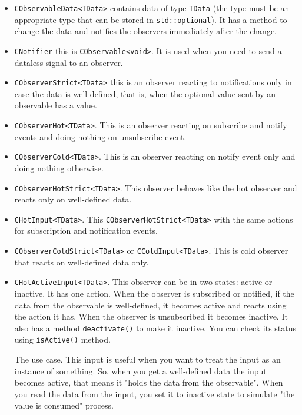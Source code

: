 \documentclass{article}
\begin{document}
\begin{itemize}
\item \verb"CObservableData<TData>" contains data of type \verb"TData" (the type must be an appropriate type that can be stored in \verb"std::optional"). It has a method to change the data and notifies the observers immediately after the change.

\item \verb"CNotifier" this is \verb"CObservable<void>". It is used when you need to send a dataless signal to an observer.

\item \verb"CObserverStrict<TData>" this is an observer reacting to notifications only in case the data is well-defined, that is, when the optional value sent by an observable has a value.

\item \verb"CObserverHot<TData>". This is an observer reacting on subscribe and notify events and doing nothing on unsubscribe event.

\item \verb"CObserverCold<TData>". This is an observer reacting on notify event only and doing nothing otherwise.

\item \verb"CObserverHotStrict<TData>". This observer behaves like the hot observer and reacts only on well-defined data.
\item \verb"CHotInput<TData>". This \verb"CObserverHotStrict<TData>" with the same actions for subscription and notification events.

\item \verb"CObserverColdStrict<TData>" or \verb"CColdInput<TData>". This is cold observer that reacts on well-defined data only.

\item \verb"CHotActiveInput<TData>". This observer can be in two states: active or inactive. It has one action. When the observer is subscribed or notified, if the data from the observable is well-defined, it becomes active and reacts using the action it has. When the observer is unsubscribed it becomes inactive. It also has a method \verb"deactivate()" to make it inactive. You can check its status using \verb"isActive()" method.

The use case. This input is useful when you want to treat the input as an instance of something. So, when you get a well-defined data the input becomes active, that means it "holds the data from the observable". When you read the data from the input, you set it to inactive state to simulate "the value is consumed" process.


\end{itemize}
\end{document}
